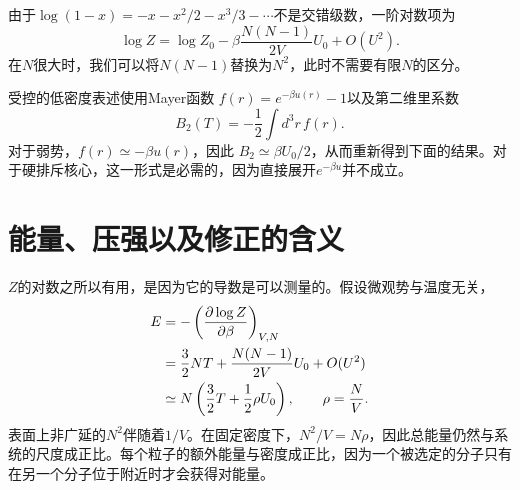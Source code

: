 \begin{classroomqa}
\end{classroomqa}

\begin{classroomqa}
\end{classroomqa}

\begin{classroomqa}
\end{classroomqa}

由于\(\log(1-x)=-x-x^2/2-x^3/3-\cdots\)不是交错级数，一阶对数项为
\begin{equation}
 \log Z
 =
 \log Z_0
 -\beta\frac{N(N-1)}{2V}U_0
 +O(U^2).
 \label{eq:sm6-logz-correction}
\end{equation}
在\(N\)很大时，我们可以将\(N(N-1)\)替换为\(N^2\)，此时不需要有限\(N\)的区分。

\begin{remark}
受控的低密度表述使用Mayer函数
\(f(r)=e^{-\beta u(r)}-1\)以及第二维里系数
\begin{equation}
 B_2(T)=-\frac{1}{2}\int d^3r\,f(r).
 \label{eq:sm6-second-virial}
\end{equation}
对于弱势，\(f(r)\simeq-\beta u(r)\)，因此
\(B_2\simeq\beta U_0/2\)，从而重新得到下面的结果。对于硬排斥核心，这一形式是必需的，因为直接展开\(e^{-\beta u}\)并不成立。
\end{remark}

\section{能量、压强以及修正的含义}

\(Z\)的对数之所以有用，是因为它的导数是可以测量的。假设微观势与温度无关，
\begin{align}
 E
 &=-\left(\frac{\partial\log Z}{\partial\beta}\right)_{V,N} \notag\\
 &=
 \frac{3}{2}NT
 +\frac{N(N-1)}{2V}U_0+O(U^2) \notag\\
 &\simeq
 N\left(\frac{3}{2}T+\frac{1}{2}\rho U_0\right),
 \qquad
 \rho=\frac{N}{V}.
 \label{eq:sm6-energy-correction}
\end{align}
表面上非广延的\(N^2\)伴随着\(1/V\)。在固定密度下，\(N^2/V=N\rho\)，因此总能量仍然与系统的尺度成正比。每个粒子的额外能量与密度成正比，因为一个被选定的分子只有在另一个分子位于附近时才会获得对能量。


